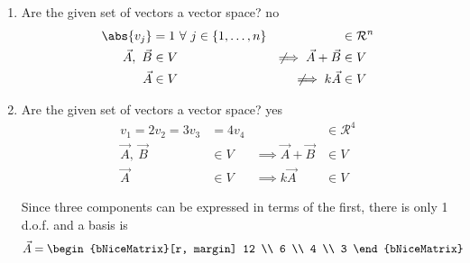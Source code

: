 \begin{enumerate}
    \item Are the given set of vectors a vector space? \textcolor{y_p}{no}
          \begin{align}
              \abs{v_j}                          & = 1\ \forall\ j \in
              \{1,\dots,n\}                      &
                                                 & \in \mathcal{R}^n     \\
              \vec{A},\ \vec{B}                  & \in V               &
              \not\!\!\implies \vec{A} + \vec{B} & \in V                 \\
              \vec{A}                            & \in V               &
              \not\!\!\implies k\vec{A}          & \in V
          \end{align}

    \item Are the given set of vectors a vector space? \textcolor{y_h}{yes}
          \begin{align}
              v_1 = 2v_2 = 3v_3          & = 4v_4            &
                                         & \in \mathcal{R}^4   \\
              \vec{A},\ \vec{B}          & \in V             &
              \implies \vec{A} + \vec{B} & \in V               \\
              \vec{A}                    & \in V             &
              \implies k\vec{A}          & \in V
          \end{align}

          Since three components can be expressed in terms of the first, there is only
          1 d.o.f. and a basis is
          \begin{align}
              \vec{A} & = \begin{bNiceMatrix}[r, margin]
                              12 \\ 6 \\ 4 \\ 3
                          \end{bNiceMatrix}
          \end{align}

\end{enumerate}